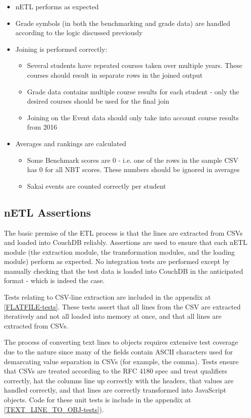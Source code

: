 \begin{itemize}
  \item nETL performs as expected
  \item Grade symbols (in both the benchmarking and grade data) are handled according to the logic discussed previously
  \item Joining is performed correctly:
        \begin{itemize}
          \item Several students have repeated courses taken over multiple years. These courses should result in separate rows in the joined output
          \item Grade data contains multiple course results for each student - only the desired courses should be used for the final join
          \item Joining on the Event data should only take into account course results from 2016
        \end{itemize}
  \item Averages and rankings are calculated
        \begin{itemize}
          \item Some Benchmark scores are 0 - i.e. one of the rows in the sample CSV has 0 for all NBT scores. These numbers should be ignored in averages
          \item Sakai events are counted correctly per student
        \end{itemize}
\end{itemize}

\subsection{nETL Assertions}
The basic premise of the ETL process is that the lines are extracted from CSVs and loaded into CouchDB reliably. Assertions are used to ensure that each nETL module (the extraction module, the transformation modules, and the loading module) perform as expected. No integration tests are performed except by manually checking that the test data is loaded into CouchDB in the anticipated format - which is indeed the case.

Tests relating to CSV-line extraction are included in the appendix at \ref{FLATFILE-tests}. These tests assert that all lines from the CSV are extracted iteratively and not all loaded into memory at once, and that all lines are extracted from CSVs.

The process of converting text lines to objects requires extensive test coverage due to the nature since many of the fields contain ASCII characters used for demarcating value separation in CSVs (for example, the comma). Tests ensure that CSVs are treated according to the RFC 4180 spec and treat qualifiers correctly, hat the columns line up correctly with the headers, that values are handled correctly, and that lines are correctly transformed into JavaScript objects. Code for these unit tests is include in the appendix at \ref{TEXT_LINE_TO_OBJ-tests}).

